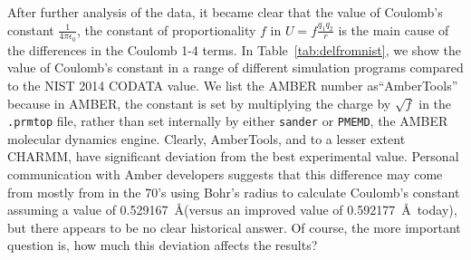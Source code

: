 After further analysis of the data, it became clear that the value of
Coulomb's constant $\frac{1}{4 \pi \epsilon_0}$, the constant of
proportionality $f$ in $U = f\frac{q_1q_2}{r}$ is the main cause of the
differences in the Coulomb 1-4 terms. In Table~\ref{tab:delfromnist},
we show the value of Coulomb's constant in a range of different
simulation programs compared to the NIST 2014 CODATA value.  We list
the AMBER number as``AmberTools''
because in AMBER, the constant is set by multiplying the charge by
$\sqrt{f}$ in the {\tt .prmtop} file, rather than set internally by
either {\tt sander} or {\tt PMEMD}, the AMBER molecular dynamics
engine.  Clearly, AmberTools, and to a lesser extent CHARMM, have
significant deviation from the best experimental value.  Personal
communication with Amber developers suggests that this difference may
come from mostly from in the 70's using Bohr's radius to calculate
Coulomb's constant assuming a value of 0.529167~\AA (versus an
improved value of 0.592177~\AA~today), but there appears to be no clear
historical answer.  Of course, the more important question is, how
much this deviation affects the results?

